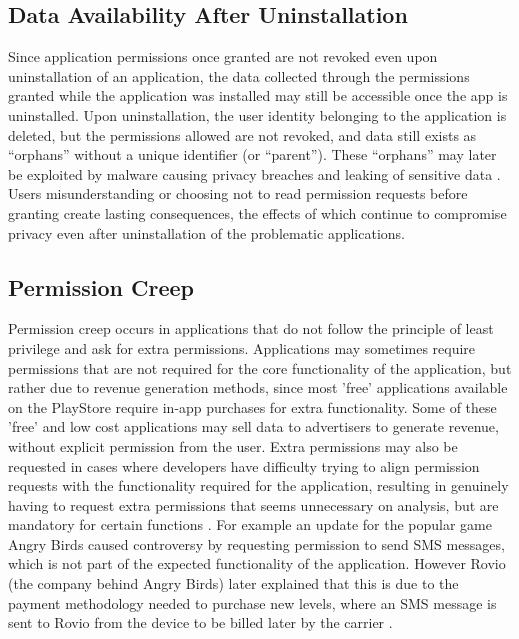 \subsection{Data Availability After Uninstallation}
Since application permissions once granted are not revoked even upon uninstallation of an application, the data collected through the permissions granted while the application was installed may still be accessible once the app is uninstalled. Upon uninstallation, the user identity belonging to the application is deleted, but the permissions allowed are not revoked, and data still exists as “orphans” without a unique identifier (or “parent”). These “orphans” may later be exploited by malware causing privacy breaches and leaking of sensitive data \cite{zhang2016life}. Users misunderstanding or choosing not to read permission requests before granting create lasting consequences, the effects of which continue to compromise privacy even after uninstallation of the problematic applications.

\subsection{Permission Creep}
Permission creep occurs in applications that do not follow the principle of least privilege and ask for extra permissions\cite{vidas2011curbing}. Applications may sometimes require permissions that are not required for the core functionality of the application, but rather due to revenue generation methods, since most 'free' applications available on the PlayStore require in-app purchases for extra functionality. Some of these 'free' and low cost applications may sell data to advertisers to generate revenue, without explicit permission from the user. Extra permissions may also be requested in cases where developers have difficulty trying to align permission requests with the functionality required for the application, resulting in genuinely having to request extra permissions that seems unnecessary on analysis, but are mandatory for certain functions \cite{vidas2011curbing}. For example an update for the popular game Angry Birds caused controversy by requesting permission to send SMS messages, which is not part of the expected functionality of the application. However Rovio (the company behind Angry Birds) later explained that this is due to the payment methodology needed to purchase new levels, where an SMS message is sent to Rovio from the device to be billed later by the carrier \cite{w} \cite{u}. 
\smallskip

